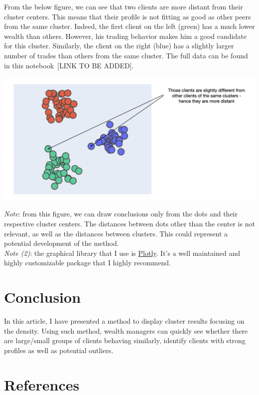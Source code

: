 From the below figure, we can see that two clients are more distant from their cluster centers. This means that their profile is not fitting as good as other peers from the same cluster. Indeed, the first client on the left (green) has a much lower wealth than others. However, his trading behavior makes him a good candidate for this cluster. Similarly, the client on the right (blue) has a slightly larger number of trades than others from the same cluster. The full data can be found in this notebook [LINK TO BE ADDED].

\begin{center}
\includegraphics[scale=0.5]{./../img/clusters-static-arrow.png}
\end{center}

\textit{Note}: from this figure, we can draw conclusions only from the dots and their respective cluster centers. The distances between dots other than the center is not relevant, as well as the distances between clusters. This could represent a potential development of the method. \\

\textit{Note (2)}: the graphical library that I use is \href{https://plotly.com/}{Plotly}. It's a well maintained and highly customizable package that I highly recommend.

\section{Conclusion}

In this article, I have presented a method to display cluster results focusing on the density. Using such method, wealth managers can quickly see whether there are large/small groups of clients behaving similarly, identify clients with strong profiles as well as potential outliers.

\section{References}

